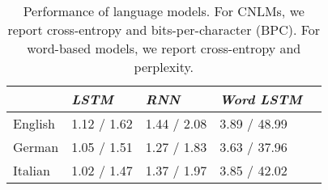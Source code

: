 \begin{table}[t]
  \begin{center}
    \begin{tabular}{l|l|l|l|l}
      \multicolumn{1}{c}{}&\emph{LSTM}&\emph{RNN}&\emph{Word LSTM}\\
      \hline
	    English & 1.12 / 1.62 & 1.44 / 2.08 & 3.89 / 48.99  \\
	    German &  1.05 / 1.51 & 1.27 / 1.83 & 3.63 / 37.96   \\
	    Italian & 1.02 / 1.47 & 1.37 / 1.97 & 3.85 / 42.02  \\
    \end{tabular}
  \end{center}
  \caption{\label{tab:lm-results} Performance of language models. For CNLMs, we report cross-entropy and bits-per-character (BPC). For word-based models, we report cross-entropy and perplexity.}
\end{table}



